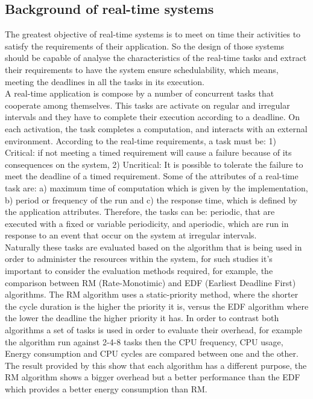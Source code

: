\documentclass[conference]{IEEEtran}
\begin{document}
\subsection{Background of real-time systems}
The greatest objective of real-time systems is to meet on time their activities to satisfy the requirements of their application. So the design of those systems should be capable of analyse the characteristics of the real-time tasks and extract their requirements to have the system ensure schedulability, which means, meeting the deadlines in all the tasks in its execution.\\
A real-time application is compose by a number of concurrent tasks that cooperate among themselves.  This tasks are activate  on regular and irregular intervals and they have to complete their execution according to a deadline. On each activation, the task completes a computation, and interacts with an external environment. According to the real-time requirements, a task must be: 1) Critical: if not meeting a timed requirement will cause a failure because of its consequences on the system, 2) Uncritical: It is possible to tolerate the failure to meet the deadline of a timed requirement. Some of the attributes of a real-time task are: a) maximum time of computation which is given by the implementation, b) period or frequency of the run and c) the response time, which is defined by the application attributes. Therefore, the tasks can be: periodic, that are executed with a fixed or variable periodicity, and aperiodic, which are run in response to an event that occur on the system at irregular intervals. \\
Naturally these tasks are evaluated based on the algorithm that is being used in order to administer the resources within the system,  for such studies it's important to consider the evaluation methods required, for example, the comparison between RM (Rate-Monotimic) and EDF (Earliest Deadline First) algorithms.\cite{BECKER01} 
The RM algorithm uses a static-priority method, where the shorter the cycle duration is the higher the priority it is, versus the EDF algorithm where the lower the deadline the higher priority it has. 
In order to contrast both algorithms a set of tasks is used in order to evaluate their overhead, for example the algorithm run against 2-4-8 tasks then the CPU frequency, CPU usage, Energy consumption and CPU cycles are compared between one and the other. 
The result provided by this \cite{BECKER01} show that each algorithm has a different purpose, the RM algorithm shows a bigger overhead but a better performance than the EDF which provides a better energy consumption than RM. 
 
\end{document}
